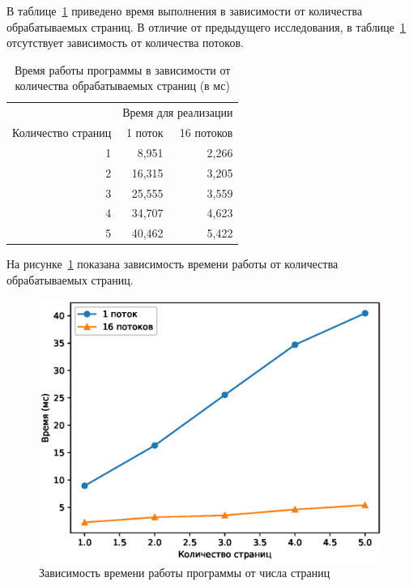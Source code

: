 В таблице~\ref{tbl:time_measurements2} приведено время выполнения в зависимости
от количества обрабатываемых страниц. В отличие от предыдущего исследования,
в таблице~\ref{tbl:time_measurements2} отсутствует зависимость от количества
потоков.

\clearpage

\begin{table}[h]
	\begin{center}
		\begin{threeparttable}
		\captionsetup{justification=raggedright,singlelinecheck=off}
		\caption{Время работы программы в зависимости от количества обрабатываемых страниц (в мс)}
		\label{tbl:time_measurements2}
                \begin{tabular}{|r|r|r|}
			\hline 
			& \multicolumn{2}{c|}{Время для реализации} \\
                        \cline{2-3}
			Количество страниц & 1 поток & 16 потоков\\
			\hline
                        1 & 8,951 & 2,266 \\
                         \hline
                        2 & 16,315 & 3,205 \\
                         \hline
                        3 & 25,555 & 3,559 \\
                         \hline
                        4 & 34,707 & 4,623 \\
                         \hline
                        5 & 40,462 & 5,422 \\
                         \hline
		\end{tabular}
		\end{threeparttable}
    \end{center}
\end{table}

На рисунке~\ref{fig:image2} показана зависимость времени работы от количества
обрабатываемых страниц.

\begin{figure}[h!]
    \centering
    \includegraphics[]{img/Figure_2.eps}
    \caption{Зависимость времени работы программы от числа страниц}
    \label{fig:image2}
\end{figure}



